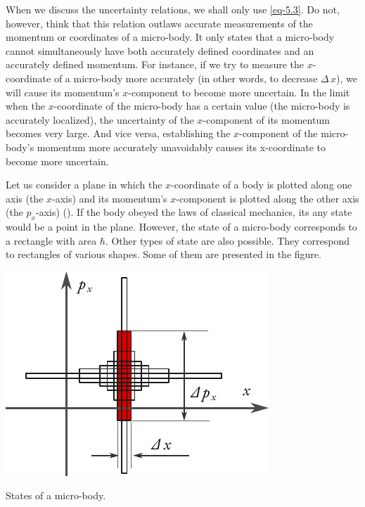 When we discuss the uncertainty relations, we shall only use \eqref{eq-5.3}. Do not, however, think that this relation outlaws accurate measurements of the momentum or coordinates of a micro-body. It only states that a micro-body cannot simultaneously have both accurately defined coordinates and an accurately defined momentum. For instance, if we try to measure the $x$-coordinate of a micro-body more accurately (in other words, to decrease $\Delta \, x$), we will cause its momentum's $x$-component to become more uncertain. In the limit when the
$x$-coordinate of the micro-body has a certain value (the micro-body is
accurately localized), the uncertainty of the $x$-component of its
momentum becomes very large. And vice versa, establishing the
$x$-component of the micro-body's momentum more accurately
unavoidably causes its x-coordinate to become more uncertain.

Let us consider a plane in which the $x$-coordinate of a body is plotted
along one axis (the $x$-axis) and its momentum's $x$-component is plotted
along the other axis (the $p_{x}$-axis) (). If the body obeyed the laws of classical mechanics, its any state would be a point in the plane. However, the state of a micro-body corresponds to a rectangle with area $\hbar$. Other types of state are also possible. They correspond to rectangles of various shapes. Some of them are presented in the figure.

\begin{marginfigure}[-2cm]
\centering
\includegraphics[width=1.\textwidth]{figures/unc.pdf}
\caption{ States of a micro-body.\label{unc}}
\end{marginfigure}

